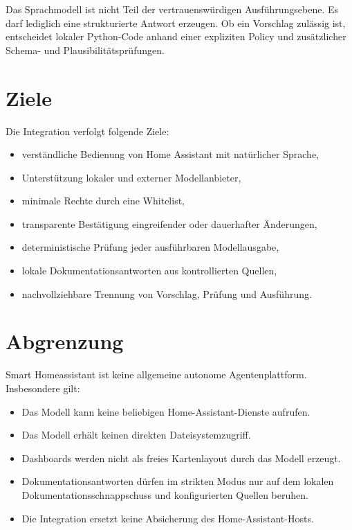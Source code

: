 \documentclass[
  11pt,
  a4paper,
  oneside,
  parskip=half
]{scrreprt}
\begin{document}
Das Sprachmodell ist nicht Teil der vertrauenswürdigen Ausführungsebene. Es darf lediglich
eine strukturierte Antwort erzeugen. Ob ein Vorschlag zulässig ist, entscheidet lokaler
Python-Code anhand einer expliziten Policy und zusätzlicher Schema- und
Plausibilitätsprüfungen.

\section{Ziele}

Die Integration verfolgt folgende Ziele:

\begin{itemize}
  \item verständliche Bedienung von Home Assistant mit natürlicher Sprache,
  \item Unterstützung lokaler und externer Modellanbieter,
  \item minimale Rechte durch eine Whitelist,
  \item transparente Bestätigung eingreifender oder dauerhafter Änderungen,
  \item deterministische Prüfung jeder ausführbaren Modellausgabe,
  \item lokale Dokumentationsantworten aus kontrollierten Quellen,
  \item nachvollziehbare Trennung von Vorschlag, Prüfung und Ausführung.
\end{itemize}

\section{Abgrenzung}

Smart Homeassistant ist keine allgemeine autonome Agentenplattform. Insbesondere gilt:

\begin{itemize}
  \item Das Modell kann keine beliebigen Home-Assistant-Dienste aufrufen.
  \item Das Modell erhält keinen direkten Dateisystemzugriff.
  \item Dashboards werden nicht als freies Kartenlayout durch das Modell erzeugt.
  \item Dokumentationsantworten dürfen im strikten Modus nur auf dem lokalen
        Dokumentationsschnappschuss und konfigurierten Quellen beruhen.
  \item Die Integration ersetzt keine Absicherung des Home-Assistant-Hosts.
\end{itemize}
\end{document}
